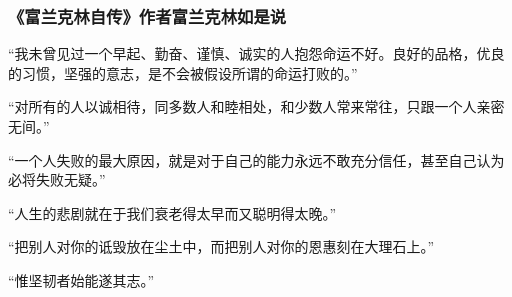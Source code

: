 \subsubsection*{《富兰克林自传》作者富兰克林如是说}

“我未曾见过一个早起、勤奋、谨慎、诚实的人抱怨命运不好。良好的品格，优良的习惯，坚强的意志，是不会被假设所谓的命运打败的。”
\par

“对所有的人以诚相待，同多数人和睦相处，和少数人常来常往，只跟一个人亲密无间。”
\par

“一个人失败的最大原因，就是对于自己的能力永远不敢充分信任，甚至自己认为必将失败无疑。”
\par

“人生的悲剧就在于我们衰老得太早而又聪明得太晚。”
\par

“把别人对你的诋毁放在尘土中，而把别人对你的恩惠刻在大理石上。”
\par

“惟坚韧者始能遂其志。”
\par
